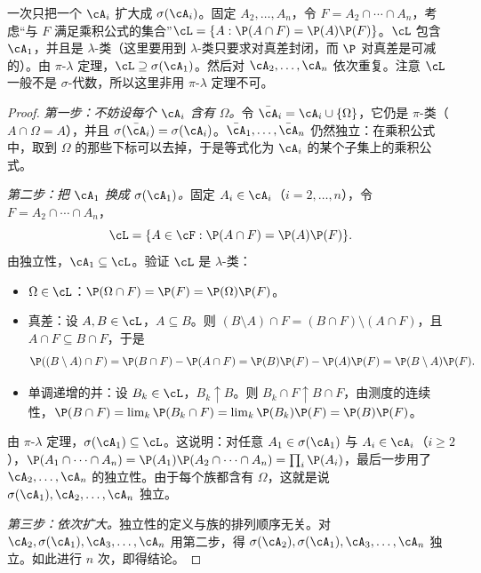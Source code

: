 \begin{remark}[证明思路]
一次只把一个 $\cA_i$ 扩大成 $\sigma(\cA_i)$。固定 $A_2,\dots,A_n$，令 $F=A_2\cap\cdots\cap A_n$，考虑“与 $F$ 满足乘积公式的集合”$\cL=\{A:\P(A\cap F)=\P(A)\P(F)\}$。$\cL$ 包含 $\cA_1$，并且是 $\lambda$-类（这里要用到 $\lambda$-类只要求对真差封闭，而 $\P$ 对真差是可减的）。由 $\pi$-$\lambda$ 定理，$\cL\supseteq\sigma(\cA_1)$。然后对 $\cA_2,\dots,\cA_n$ 依次重复。注意 $\cL$ 一般不是 $\sigma$-代数，所以这里非用 $\pi$-$\lambda$ 定理不可。
\end{remark}

\begin{proof}
\emph{第一步：不妨设每个 $\cA_i$ 含有 $\Omega$。}令 $\bar\cA_i=\cA_i\cup\{\Omega\}$，它仍是 $\pi$-类（$A\cap\Omega=A$），并且 $\sigma(\bar\cA_i)=\sigma(\cA_i)$。$\bar\cA_1,\dots,\bar\cA_n$ 仍然独立：在乘积公式中，取到 $\Omega$ 的那些下标可以去掉，于是等式化为 $\cA_i$ 的某个子集上的乘积公式。

\emph{第二步：把 $\cA_1$ 换成 $\sigma(\cA_1)$。}固定 $A_i\in\cA_i$（$i=2,\dots,n$），令 $F=A_2\cap\cdots\cap A_n$，
\[
\cL=\{A\in\cF:\P(A\cap F)=\P(A)\P(F)\}.
\]
由独立性，$\cA_1\subseteq\cL$。验证 $\cL$ 是 $\lambda$-类：
\begin{itemize}
\item $\Omega\in\cL$：$\P(\Omega\cap F)=\P(F)=\P(\Omega)\P(F)$。
\item 真差：设 $A,B\in\cL$，$A\subseteq B$。则 $(B\setminus A)\cap F=(B\cap F)\setminus(A\cap F)$，且 $A\cap F\subseteq B\cap F$，于是
\[
\P((B\setminus A)\cap F)=\P(B\cap F)-\P(A\cap F)=\P(B)\P(F)-\P(A)\P(F)=\P(B\setminus A)\P(F).
\]
\item 单调递增的并：设 $B_k\in\cL$，$B_k\uparrow B$。则 $B_k\cap F\uparrow B\cap F$，由测度的连续性，$\P(B\cap F)=\lim_k\P(B_k\cap F)=\lim_k\P(B_k)\P(F)=\P(B)\P(F)$。
\end{itemize}
由 $\pi$-$\lambda$ 定理，$\sigma(\cA_1)\subseteq\cL$。这说明：对任意 $A_1\in\sigma(\cA_1)$ 与 $A_i\in\cA_i$（$i\geqslant2$），$\P(A_1\cap\cdots\cap A_n)=\P(A_1)\P(A_2\cap\cdots\cap A_n)=\prod_i\P(A_i)$，最后一步用了 $\cA_2,\dots,\cA_n$ 的独立性。由于每个族都含有 $\Omega$，这就是说 $\sigma(\cA_1),\cA_2,\dots,\cA_n$ 独立。

\emph{第三步：依次扩大。}独立性的定义与族的排列顺序无关。对 $\cA_2,\sigma(\cA_1),\cA_3,\dots,\cA_n$ 用第二步，得 $\sigma(\cA_2),\sigma(\cA_1),\cA_3,\dots,\cA_n$ 独立。如此进行 $n$ 次，即得结论。
\end{proof}


